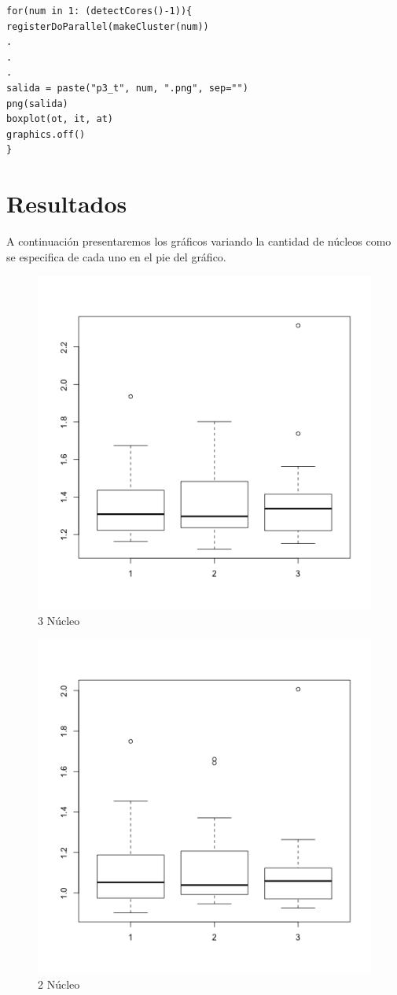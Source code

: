 \documentclass[a4paper]{article}
\begin{document}
\lstset{language=R, breaklines=true, basicstyle=\footnotesize}

\begin{lstlisting}[frame=single]
for(num in 1: (detectCores()-1)){
registerDoParallel(makeCluster(num))
.
.
.
salida = paste("p3_t", num, ".png", sep="")
png(salida)
boxplot(ot, it, at)
graphics.off()
}
\end{lstlisting}

\section{Resultados}
A continuación presentaremos los gráficos variando la cantidad de núcleos como se especifica de cada uno en el pie del gráfico.

\begin{figure}
\centering
\includegraphics[width=0.7\linewidth]{p3_t1}
\caption[3 Núcleo]{3 Núcleo}
\label{fig:3Núcleos}
\end{figure}

\begin{figure}
\centering
\includegraphics[width=0.7\linewidth]{p3_t2}
\caption[2 Núcleo]{2 Núcleo}
\label{fig:2 Núcleos}
\end{figure}
\end{document}
